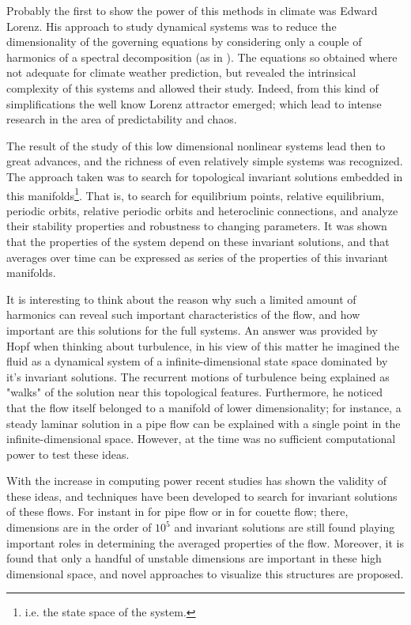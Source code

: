 \documentclass{article}%
\begin{document}
Probably the first to show the power of this methods in climate was Edward Lorenz. His approach to study
dynamical systems was to reduce the dimensionality of the governing equations by considering
only a couple of harmonics of a spectral decomposition (as in \cite{Lorenz60}). The equations
so obtained where not adequate for climate weather prediction, but revealed the intrinsical
complexity of this systems and allowed their study. Indeed, from this kind of simplifications
the well know Lorenz attractor emerged; which lead to intense research in the area of predictability
and chaos.

The result of the study of this low dimensional nonlinear systems lead then to great advances, and
the richness of even relatively simple systems was recognized. The approach taken was to search for topological invariant solutions embedded in this manifolds\footnote{
i.e. the state space of the system.
}.
That is, to search for equilibrium points, relative equilibrium, periodic orbits, relative periodic orbits and heteroclinic connections,
and analyze their stability properties and robustness to changing parameters. It was shown that the properties of the system
depend on these invariant solutions, and that averages over time can be expressed as series of the
properties of this invariant manifolds.

It is interesting to think about the reason why such a limited amount of harmonics can reveal
such important characteristics of the flow, and how important are this solutions for the full systems.
An answer was provided by Hopf when thinking about turbulence, in his view of this matter he imagined the fluid as a dynamical
system of a infinite-dimensional state space dominated by it's invariant solutions. The recurrent motions
of turbulence being explained as "walks" of the solution near this topological features. Furthermore, he noticed
that the flow itself belonged to a manifold of lower dimensionality; for instance, a steady laminar solution in a pipe
flow can be explained with a single point in the infinite-dimensional space. However, at the time was no sufficient
computational power to test these ideas.

With the increase in computing power recent studies has shown the validity of these ideas, and techniques have been developed to search for invariant
solutions of these flows. For instant in \cite{CvWiAv12} for pipe flow or in \cite{n00bs} for couette flow; there, dimensions are in the
order of $10^5$ and invariant solutions are still found playing important roles in determining the
averaged properties of the flow. Moreover, it is found that only a handful of unstable dimensions are important
in these high dimensional space, and novel approaches to visualize this structures are proposed.
\end{document}
